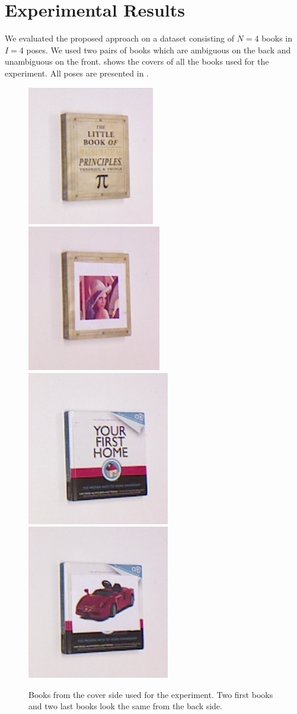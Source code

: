 \section{Experimental Results}



    We evaluated the proposed approach on a dataset consisting of $N = 4$ books in $I = 4$ poses. We used two pairs of books which are ambiguous on the back and unambiguous on the front.  shows the covers of all the books used for the experiment. All poses are presented in . 
    
\begin{figure}
\centering
    		\includegraphics[width = 0.2\columnwidth]{pics/math_cover1_ok.jpg}
    		\includegraphics[width = 0.2\columnwidth]{pics/math_cover2_ok.jpg}
    		\includegraphics[width = 0.2\columnwidth]{pics/first_cover1.jpg}
    		\includegraphics[width = 0.2\columnwidth]{pics/first_cover2.jpg}
    		\caption{Books from the cover side used for the experiment. Two first books and two last books look the same from the back side.}
	\label{fig:object_dataset}
    \end{figure}     
    
